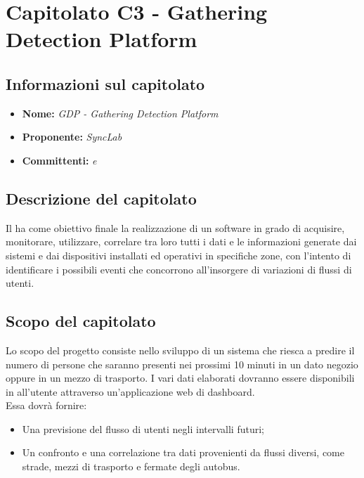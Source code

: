 \section{Capitolato C3 - Gathering Detection Platform}\label{C3}
\subsection{Informazioni sul capitolato}
\begin{itemize}
	\item \textbf{Nome:} \textit{GDP - Gathering Detection Platform} 
	\item \textbf{Proponente:} \textit{SyncLab}
	\item \textbf{Committenti:} \textit{\VT{} e \CR{}}
\end{itemize}

\subsection{Descrizione del capitolato}
Il  ha come obiettivo finale la realizzazione di un  software in grado di acquisire, monitorare, utilizzare, correlare tra loro tutti i dati e le informazioni generate dai sistemi e dai dispositivi installati ed operativi in specifiche zone, con l’intento di identificare i possibili eventi che concorrono all’insorgere di variazioni di flussi di utenti.

\subsection{Scopo del capitolato}
Lo scopo del progetto consiste nello sviluppo di un sistema che riesca a predire il numero di persone che saranno presenti nei prossimi 10 minuti in un dato negozio oppure in un mezzo di trasporto. I vari dati elaborati dovranno essere disponibili in  all'utente attraverso un'applicazione web di dashboard. \\
Essa dovrà fornire:
\begin{itemize}
	\item Una previsione del flusso di utenti negli intervalli futuri;
	\item Un confronto e una correlazione tra dati provenienti da flussi diversi, come strade, mezzi di trasporto e fermate degli autobus.
\end{itemize}


